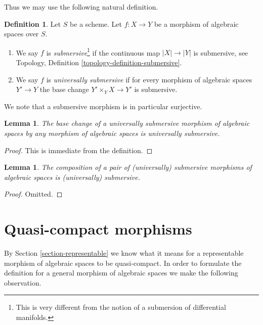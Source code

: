 \documentclass{stacks-project}
\theoremstyle{plain}
\newtheorem{lemma}[subsection]{Lemma}
\theoremstyle{definition}
\newtheorem{definition}[subsection]{Definition}
\theoremstyle{remark}
\numberwithin{equation}{subsection}
\begin{document}
\noindent
Thus we may use the following natural definition.

\begin{definition}
\label{definition-submersive}
Let $S$ be a scheme.
Let $f : X \to Y$ be a morphism of algebraic spaces over $S$.
\begin{enumerate}
\item We say $f$ is {\it submersive}\footnote{This is very different
from the notion of a submersion of differential manifolds.}
if the continuous map $|X| \to |Y|$ is submersive, see
Topology, Definition \ref{topology-definition-submersive}.
\item We say $f$ is {\it universally submersive} if for every
morphism of algebraic spaces $Y' \to Y$ the base change
$Y' \times_Y X \to Y'$ is submersive.
\end{enumerate}
\end{definition}

\noindent
We note that a submersive morphism is in particular surjective.

\begin{lemma}
\label{lemma-base-change-universally-submersive}
The base change of a universally submersive morphism of algebraic spaces
by any morphism of algebraic spaces is universally submersive.
\end{lemma}

\begin{proof}
This is immediate from the definition.
\end{proof}

\begin{lemma}
\label{lemma-composition-universally-submersive}
The composition of a pair of (universally) submersive morphisms of
algebraic spaces is (universally) submersive.
\end{lemma}

\begin{proof}
Omitted.
\end{proof}












\section{Quasi-compact morphisms}
\label{section-quasi-compact}

\noindent
By Section \ref{section-representable} we know what it means for
a representable morphism of algebraic spaces to be quasi-compact.
In order to formulate the definition for a general morphism
of algebraic spaces we make the following observation.
\end{document}
